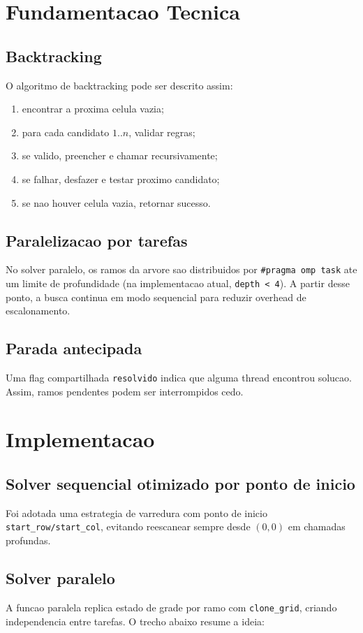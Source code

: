 \documentclass[11pt,a4paper]{article}
\begin{document}
\section{Fundamentacao Tecnica}
\subsection{Backtracking}
O algoritmo de backtracking pode ser descrito assim:
\begin{enumerate}
  \item encontrar a proxima celula vazia;
  \item para cada candidato \(1..n\), validar regras;
  \item se valido, preencher e chamar recursivamente;
  \item se falhar, desfazer e testar proximo candidato;
  \item se nao houver celula vazia, retornar sucesso.
\end{enumerate}

\subsection{Paralelizacao por tarefas}
No solver paralelo, os ramos da arvore sao distribuidos por \texttt{\#pragma omp task} ate um limite de profundidade (na implementacao atual, \texttt{depth < 4}). A partir desse ponto, a busca continua em modo sequencial para reduzir overhead de escalonamento.

\subsection{Parada antecipada}
Uma flag compartilhada \texttt{resolvido} indica que alguma thread encontrou solucao. Assim, ramos pendentes podem ser interrompidos cedo.

\section{Implementacao}
\subsection{Solver sequencial otimizado por ponto de inicio}
Foi adotada uma estrategia de varredura com ponto de inicio \texttt{start\_row/start\_col}, evitando reescanear sempre desde \((0,0)\) em chamadas profundas.

\subsection{Solver paralelo}
A funcao paralela replica estado de grade por ramo com \texttt{clone\_grid}, criando independencia entre tarefas. O trecho abaixo resume a ideia:
\end{document}
